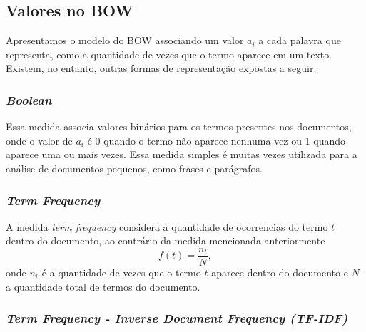 \subsection{Valores no BOW}
\label{sec:representação_dos_termos}

Apresentamos o modelo do BOW associando um valor \(a_i\) a cada palavra que representa, como a quantidade de vezes que o termo aparece em um texto. Existem, no entanto, outras formas de representação expostas a seguir.

\subsubsection{\textit{Boolean}}
\label{ssub:bag-boolean}

Essa medida associa valores binários para os termos presentes nos documentos, onde o valor de \(a_{i}\) é 0 quando o termo não aparece nenhuma vez ou 1 quando aparece uma ou mais vezes. Essa medida simples é muitas vezes utilizada para a análise de documentos pequenos, como frases e parágrafos.

\subsubsection{\textit{Term Frequency}}
\label{ssub:baf-tf}

A medida \textit{term frequency} considera a quantidade de ocorrencias do termo \(t\) dentro do documento, ao contrário da medida mencionada anteriormente \cite{buckley1988}
%
\begin{equation}
f(t)=\frac{n_t}{N},
\end{equation}
%
onde \(n_t\) é a quantidade de vezes que o termo \(t\) aparece dentro do documento e \(N\) a quantidade total de termos do documento.

\subsubsection{\textit{Term Frequency - Inverse Document Frequency (TF-IDF)}}
\label{ssub:baf-tfidf}

